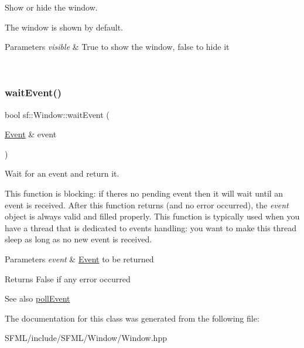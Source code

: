 Show or hide the window. 

The window is shown by default.


\begin{DoxyParams}{Parameters}
{\em visible} & True to show the window, false to hide it \begin{DoxyVerb}\end{DoxyVerb}
 \\
\hline
\end{DoxyParams}
\mbox{\label{classsf_1_1_window_aaf02ab64fbc1d374eef3696df54137bc}} 
\subsubsection{\texorpdfstring{waitEvent()}{waitEvent()}}
{\footnotesize\ttfamily bool sf\+::\+Window\+::wait\+Event (\begin{DoxyParamCaption}\item[{\mbox{\hyperlink{classsf_1_1_event}{Event}} \&}]{event }\end{DoxyParamCaption})}



Wait for an event and return it. 

This function is blocking\+: if there\textquotesingle{}s no pending event then it will wait until an event is received. After this function returns (and no error occurred), the {\itshape event} object is always valid and filled properly. This function is typically used when you have a thread that is dedicated to events handling\+: you want to make this thread sleep as long as no new event is received. 
\begin{DoxyCode}{0}
\DoxyCodeLine{\{}
\DoxyCodeLine{   \textcolor{comment}{// process event...}}
\DoxyCodeLine{\}}
\end{DoxyCode}



\begin{DoxyParams}{Parameters}
{\em event} & \mbox{\hyperlink{classsf_1_1_event}{Event}} to be returned\\
\hline
\end{DoxyParams}
\begin{DoxyReturn}{Returns}
False if any error occurred
\end{DoxyReturn}
\begin{DoxySeeAlso}{See also}
\mbox{\hyperlink{classsf_1_1_window_a338e996585faf82e93069858e3b531b7}{poll\+Event}} \begin{DoxyVerb}\end{DoxyVerb}
 
\end{DoxySeeAlso}


The documentation for this class was generated from the following file\+:\begin{DoxyCompactItemize}
\item 
S\+F\+M\+L/include/\+S\+F\+M\+L/\+Window/Window.\+hpp\end{DoxyCompactItemize}
